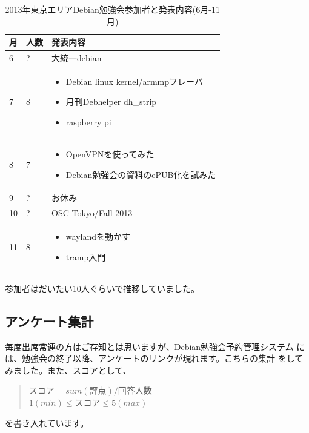 \documentclass[mingoth,a4paper]{jsarticle}
\begin{document}
\begin{table}[ht]
\begin{center}
\begin{tabular}{|l|l|p{10cm}|}
\hline 
月&人数&発表内容 \\ \hline \hline
6& ? & 大統一debian\\ \hline
7& 8 &  
\begin{itemize}
\item Debian linux kernel/armmpフレーバ
\item 月刊Debhelper dh\_strip
\item raspberry pi
\end{itemize}
\\ \hline
8& 7 & 
\begin{itemize}
\item OpenVPNを使ってみた
\item Debian勉強会の資料のePUB化を試みた
\end{itemize}
\\ \hline
9& ? & お休み \\ \hline
10& ? &  OSC Tokyo/Fall 2013 \\ \hline
11& 8 & 
\begin{itemize}
\item waylandを動かす
\item tramp入門
\end{itemize}
\\ \hline
\end{tabular}
\label{tab:debian-meeting-summary}
\caption{2013年東京エリアDebian勉強会参加者と発表内容(6月-11月)}
\end{center}
\end{table}

 参加者はだいたい10人ぐらいで推移していました。

\subsection{アンケート集計}

 毎度出席常連の方はご存知とは思いますが、Debian勉強会予約管理システム
には、勉強会の終了以降、アンケートのリンクが現れます。こちらの集計
をしてみました。また、スコアとして、
\begin{quote}
$スコア=sum(評点)/回答人数$\\
$1(min) \leq スコア \leq 5(max)$
\end{quote}
を書き入れています。
\end{document}
